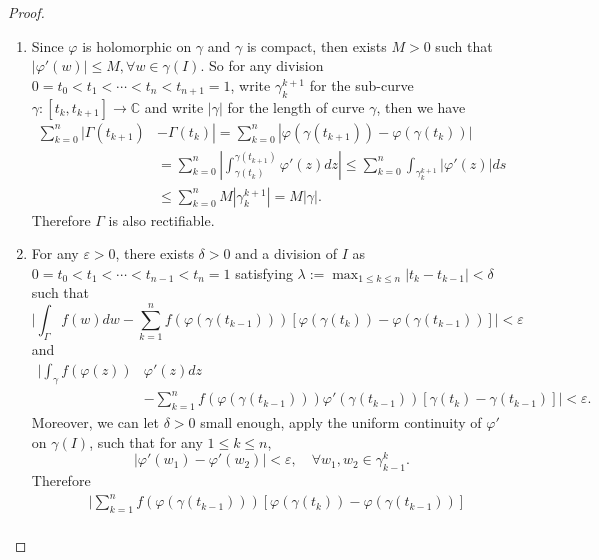 \documentclass[12pt]{article}
\renewcommand{\(}{\left(}%
\renewcommand{\)}{\right)}%
\renewcommand{\[}{\left[}%
\renewcommand{\]}{\right]}%
\renewcommand{\c}{\mathbb{C}}
\newtheorem{proof}{Proof.}}
\begin{document}
 \begin{proof}
 	\begin{enumerate}
 		\item Since $\varphi$ is holomorphic on $\gamma$ and $\gamma$ is compact, then exists $M>0$ such that $|\varphi'(w)|\leq M,\forall w\in\gamma(I)$. So for any division $0=t_0<t_1<\cdots<t_{n}<t_{n+1}=1$, write $\gamma_k^{k+1}$ for the sub-curve $\gamma:[t_k,t_{k+1}]\to\c$ and write $|\gamma|$ for the length of curve $\gamma$, then we have
 		\begin{equation*}
 			\begin{split}
 				\sum_{k=0}^n |\Gamma(t_{k+1})&-\Gamma(t_k)|=\sum_{k=0}^n |\varphi(\gamma (t_{k+1}))-\varphi(\gamma (t_{k}))|\\
 				&=\sum_{k=0}^n \left|\int_{\gamma(t_{k})}^{\gamma(t_{k+1})}\varphi'(z)dz\right|\leq \sum_{k=0}^n \int_{\gamma_{k}^{k+1}}|\varphi'(z)|ds\\
 				&\leq \sum_{k=0}^nM|\gamma_{k}^{k+1}|=M|\gamma|.
 			\end{split}
 		\end{equation*}
 		Therefore $\Gamma$ is also rectifiable. 
 		\item For any $\varepsilon>0$, there exists $\delta>0$ and a division of $I$ as $0=t_0<t_1<\cdots<t_{n-1}<t_n=1$ satisfying $\lambda:=\max_{1\leq k\leq n}|t_k-t_{k-1}|<\delta$ such that
 		\begin{equation*}
 			\Bigg|\int_\Gamma f(w)dw-\sum_{k=1}^nf(\varphi(\gamma(t_{k-1})))[\varphi(\gamma(t_k) )-\varphi(\gamma(t_{k-1}) )]\Bigg|<\varepsilon
 		\end{equation*}
 		and
 		\begin{equation*}
 			\begin{split}
 				\Bigg|\int_\gamma f(\varphi(z))&\varphi'(z)dz\\
 				&-\sum_{k=1}^nf(\varphi(\gamma(t_{k-1})))\varphi'(\gamma(t_{k-1}))[\gamma(t_k)-\gamma(t_{k-1})]\Bigg|<\varepsilon.
 			\end{split}
 		\end{equation*}
 		Moreover, we can let $\delta>0$ small enough, apply the uniform continuity of $\varphi'$ on $\gamma(I)$, such that for any $1\leq k\leq n$,
 		\begin{equation*}
 			|\varphi'(w_1)-\varphi'(w_2) |<\varepsilon,\quad \forall  w_1,w_2\in \gamma_{k-1}^k.
 		\end{equation*}
 		Therefore
 		\begin{equation*}
 			\begin{split}
 				&\Bigg|\sum_{k=1}^nf(\varphi(\gamma(t_{k-1})))[\varphi(\gamma(t_k) )-\varphi(\gamma(t_{k-1}) )]\\

\end{split}
\end{equation*}
\end{enumerate}
\end{proof}
\end{document}
